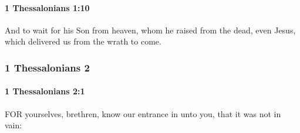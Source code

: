 		\paragraph{1 Thessalonians 1:10} %
			\label{1THESSALONIANS-1-10}

			And to wait for his Son from heaven, whom he raised from the dead, even Jesus, which delivered us from the wrath to come.

			\begin{framed}
			\scriptsize
				\begin{compactdesc}
					\item[SBLG] 
				\end{compactdesc}
			\end{framed}

	\subsubsection{1 Thessalonians 2} %
		\label{1THESSALONIANS-2}
		
		\paragraph{1 Thessalonians 2:1} %
			\label{1THESSALONIANS-2-1}

			FOR yourselves, brethren, know our entrance in unto you, that it was not in vain:

